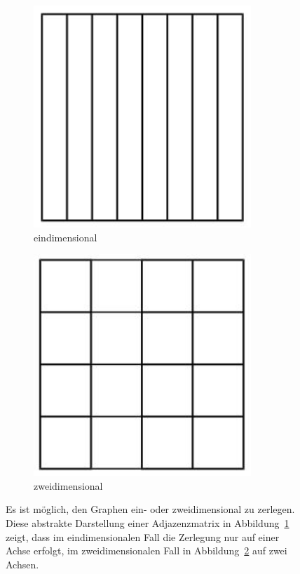 \documentclass[11pt,a4paper]{article}
\begin{document}
\begin{figure}[h]
    \centering
    \begin{subfigure}[b]{0.3\textwidth}
        \includegraphics[width=0.9\textwidth]{eindim}
        \caption{eindimensional}
        \label{fig:eindim}
    \end{subfigure}
   \qquad
    \begin{subfigure}[b]{0.3\textwidth}
        \includegraphics[width=0.9\textwidth]{zweidim}
        \caption{zweidimensional}
        \label{fig:zweidim}
    \end{subfigure}
    \caption{Es ist möglich, den Graphen ein- oder zweidimensional zu zerlegen. Diese abstrakte Darstellung einer Adjazenzmatrix in Abbildung~\ref{fig:eindim} zeigt, dass im eindimensionalen Fall die Zerlegung nur auf einer Achse erfolgt, im zweidimensionalen Fall in Abbildung~\ref{fig:zweidim} auf zwei Achsen.}
\label{fig:zerlegung}
\end{figure}
\end{document}
